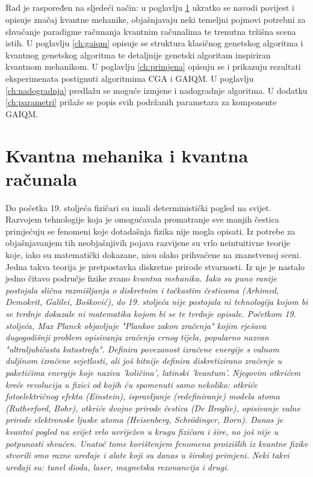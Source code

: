 \documentclass[times, utf8, zavrsni, numeric]{fer}
\begin{document}
\paragraph{}
Rad je raspoređen na sljedeći način: u poglavlju \ref{ch:kvameh} ukratko se navodi povijest i opisuje značaj kvantne mehanike, objašnjavaju neki temeljni pojmovi potrebni za shvaćanje paradigme računanja kvantnim računalima te trenutna tržišna scena istih. U poglavlju \ref{ch:gaiqm} opisuje se struktura klasičnog genetskog algoritma i kvantnog genetskog algoritma te detaljnije genetski algoritam inspiriran kvantnom mehanikom. U poglavlju \ref{ch:primjena} opisuju se i prikazuju rezultati eksperimenata postignuti algoritmima CGA i GAIQM. 
U poglavlju \ref{ch:nadogradnja} predlažu se moguće izmjene i nadogradnje algoritma. U dodatku \ref{ch:parametri} prilaže se popis svih podržanih parametara za komponente GAIQM.

\chapter{Kvantna mehanika i kvantna računala}
\label{ch:kvameh}
Do početka 19. stoljeća fizičari su imali deterministički pogled na svijet. Razvojem tehnologije koja je omogućavala promatranje sve manjih čestica primjećuju se fenomeni koje dotadašnja fizika nije mogla opisati. Iz potrebe za objašnjavanjem tih neobjašnjivih pojava razvijene su vrlo neintuitivne teorije koje, iako su matematički dokazane, nisu olako prihvaćene na znanstvenoj sceni. Jedna takva teorija je pretpostavka diskretne prirode stvarnosti. Iz nje je nastalo jedno čitavo područje fizike zvano \it kvantna mehanika\rm . Iako su puno ranije postojala slična razmišljanja o diskretnim i točkastim česticama (Arhimed, Demokrit, Galilei, Bošković), do 19. stoljeća nije postojala ni tehnologija kojom bi se tvrdnje dokazale ni matematika kojom bi se te tvrdnje opisale. Početkom 19. stoljeća, Max Planck objavljuje "\it Plankov zakon zračenja\rm" kojim rješava dugogodišnji problem opisivanja zračenja crnog tijela, popularno nazvan "\it ultraljubičasta katastrofa\rm". Definira povezanost izračene energije s valnom duljinom izračene svjetlosti, ali još bitnije definira diskretizirano zračenje u paketićima energije koje naziva 'količina', latinski 'kvantum'. Njegovim otkrićem kreće revolucija u fizici od kojih ću spomenuti samo nekoliko: otkriće fotoelektričnog efekta (Einstein), ispravljanje (redefiniranje) modela atoma (Rutherford, Bohr), otkriće dvojne prirode čestica (De Broglie), opisivanje valne prirode elektronske ljuske atoma (Heisenberg, Schr\"odinger, Born). \citep{bozja_cestica} Danas je kvantni pogled na svijet vrlo uvriježen u krugu fizičara i šire, no još nije u potpunosti shvaćen. Unatoč tome korištenjem fenomena proizišlih iz kvantne fizike stvorili smo razne uređaje i alate koji su danas u širokoj primjeni. Neki takvi uređaji su: tunel dioda, laser, magnetska rezonancija i drugi.
\end{document}
